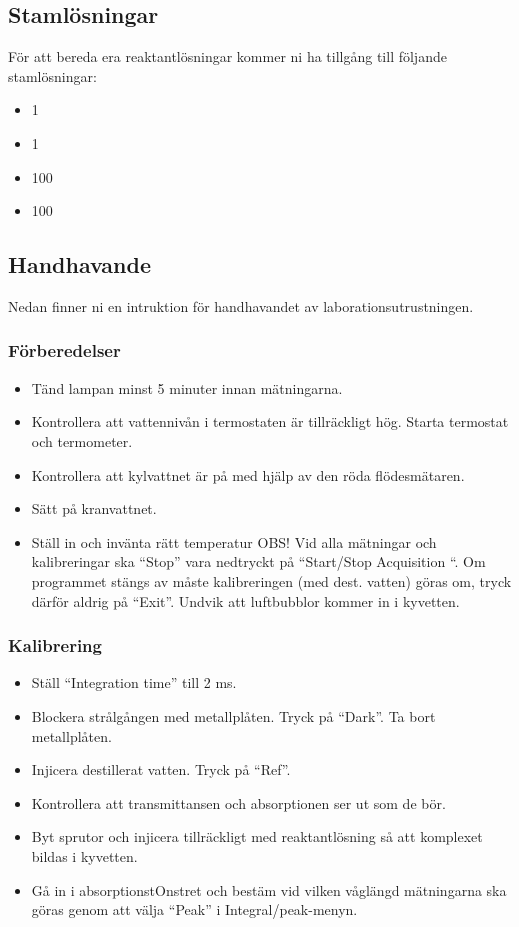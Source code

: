 \subsection{Stamlösningar}
För att bereda era reaktantlösningar kommer ni ha tillgång till följande
stamlösningar:

\begin{itemize}
\item \SI{1}{\Molar} 
\item \SI{1}{\Molar} 
\item \SI{100}{\milli\Molar} 
\item \SI{100}{\milli\Molar} 
\end{itemize}

\subsection{Handhavande}
\label{sec:handhavande}
Nedan finner ni en intruktion för handhavandet av
laborationsutrustningen.

\subsubsection{Förberedelser}
\begin{itemize}
\item Tänd lampan minst 5 minuter innan mätningarna.
\item Kontrollera att vattennivån i termostaten är tillräckligt hög.
Starta termostat och termometer.
\item Kontrollera att kylvattnet är på med hjälp av den röda flödesmätaren.
\item Sätt på kranvattnet.
\item Ställ in och invänta rätt temperatur
OBS! Vid alla mätningar och kalibreringar ska ``Stop'' vara nedtryckt på ``Start/Stop
Acquisition ``. Om programmet stängs av måste kalibreringen (med dest. vatten) göras om,
tryck därför aldrig på ``Exit''. Undvik att luftbubblor kommer in i kyvetten.
\end{itemize}
\subsubsection{Kalibrering}
\begin{itemize}
\item Ställ ``Integration time'' till 2 ms.
\item Blockera strålgången med metallplåten. Tryck på ``Dark''. Ta bort metallplåten.
\item Injicera destillerat vatten. Tryck på ``Ref''.
\item Kontrollera att transmittansen och absorptionen ser ut som de bör.
\item Byt sprutor och injicera tillräckligt med reaktantlösning så att komplexet bildas i kyvetten.
\item Gå in i absorptionstOnstret och bestäm vid vilken våglängd mätningarna ska göras genom
att välja ``Peak'' i Integral/peak-menyn.
\end{itemize}
